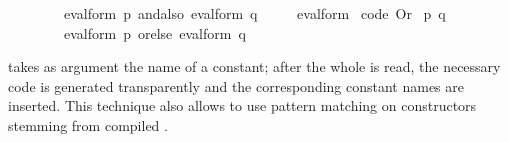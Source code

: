 \begin{isabellebody}
\ \ \ \ \ \ \ \ eval{\isacharunderscore}form\ p\ andalso\ eval{\isacharunderscore}form\ q\isanewline
\ \ \ \ {\isacharbar}\ eval{\isacharunderscore}form\ {\isacharparenleft}%
\isaantiq
code\ Or%
\endisaantiq
\ {\isacharparenleft}p{\isacharcomma}\ q{\isacharparenright}{\isacharparenright}\ {\isacharequal}\isanewline
\ \ \ \ \ \ \ \ eval{\isacharunderscore}form\ p\ orelse\ eval{\isacharunderscore}form\ q{\isacharsemicolon}\isanewline
{\isacharverbatimclose}%
\endisatagquotett
{\isafoldquotett}%
%
\isadelimquotett
%
\endisadelimquotett
%
\begin{isamarkuptext}%
\noindent {} takes as argument the name of a constant;  after the
  whole  is read, the necessary code is generated transparently
  and the corresponding constant names are inserted.  This technique also
  allows to use pattern matching on constructors stemming from compiled
  .


\end{isamarkuptext}
\end{isabellebody}
